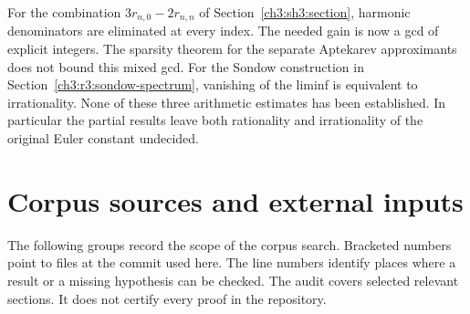 \documentclass[11pt,a4paper,oneside,openany]{report}
\theoremstyle{remark}\newtheorem{remark}[theorem]{Remark}
\numberwithin{equation}{section}
\begin{document}
For the combination $3r_{n,0}-2r_{n,n}$ of Section~\ref{ch3:sh3:section}, harmonic denominators are eliminated at every index. The needed gain is now a gcd of explicit integers. The sparsity theorem for the separate Aptekarev approximants does not bound this mixed gcd. For the Sondow construction in Section~\ref{ch3:r3:sondow-spectrum}, vanishing of the liminf is equivalent to irrationality. None of these three arithmetic estimates has been established. In particular the partial results leave both rationality and irrationality of the original Euler constant undecided.

\section*{Corpus sources and external inputs}
The following groups record the scope of the corpus search. Bracketed numbers point to files at the commit used here. The line numbers identify places where a result or a missing hypothesis can be checked. The audit covers selected relevant sections. It does not certify every proof in the repository.
\end{document}
